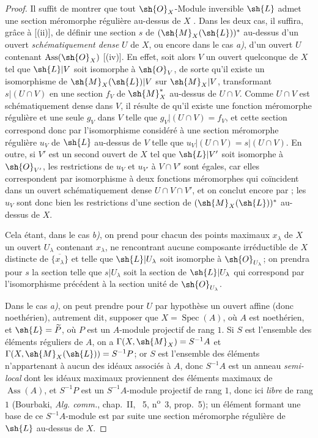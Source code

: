 \begin{proof}
Il suffit de montrer que tout $\sh{O}_X$-Module inversible $\sh{L}$ admet une section méromorphe régulière au-dessus de $X$ .
Dans les deux cas, il suffira, grâce à [(ii)], de définir une section $s$ de $(\sh{M}_X(\sh{L}))^*$ au-dessus d'un ouvert \emph{schématiquement dense} $U$ de $X$, ou encore dans le cas \emph{a)}, d'un ouvert $U$ contenant $\operatorname{Ass}(\sh{O}_X)$ [(iv)].
En effet, soit alors $V$ un ouvert quelconque de $X$ tel que $\sh{L}|V$ soit isomorphe à $\sh{O}_V$, de sorte qu'il existe un isomorphisme de $\sh{M}_X(\sh{L})|V$ sur $\sh{M}_X|V$, transformant $s|(U\cap V)$ en une section $f_V$ de $\sh{M}_X^*$ au-dessus de $U\cap V$.
Comme $U\cap V$ est schématiquement dense dans $V$, il résulte de  qu'il existe une fonction méromorphe régulière et une seule $g_V$ dans $V$ telle que $g_V|(U\cap V)=f_V$, et cette section correspond donc par l'isomorphisme considéré à une section méromorphe régulière $u_V$ de $\sh{L}$ au-dessus de $V$ telle que $u_V|(U\cap V)=s|(U\cap V)$.
En outre, si $V'$ est un second ouvert de $X$ tel que $\sh{L}|V'$ soit isomorphe à $\sh{O}_{V'}$, les restrictions de $u_V$ et $u_{V'}$ à $V\cap V'$ sont égales, car elles correspondent par isomorphisme à deux fonctions méromorphes qui coïncident dans un ouvert schématiquement dense $U\cap V\cap V'$, et on conclut encore par ;
les $u_V$ sont donc bien les restrictions d'une section de $(\sh{M}_X(\sh{L}))^*$ au-dessus de $X$.

Cela étant, dans le cas \emph{b)}, on prend pour chacun des points maximaux $x_\lambda$ de $X$ un ouvert $U_\lambda$ contenant $x_\lambda$, ne rencontrant aucune composante irréductible de $X$ distincte de $\overline{\{x_\lambda\}}$ et telle que $\sh{L}|U_\lambda$ soit isomorphe à $\sh{O}_{U_\lambda}$;
on prendra pour $s$ la section telle que $s|U_\lambda$ soit la section de $\sh{L}|U_\lambda$ qui correspond par l'isomorphisme précédent à la section unité de $\sh{O}_{U_\lambda}$.

Dans le cas \emph{a)}, on peut prendre pour $U$ par hypothèse un ouvert affine (donc noethérien), autrement dit, supposer que $X=\operatorname{Spec}(A)$, où $A$ est noethérien, et $\sh{L}=\widetilde{P}$, où $P$ est un $A$-module projectif de rang $1$.
Si $S$ est l'ensemble des éléments réguliers de $A$, on a $\Gamma(X,\sh{M}_X)=S^{-1}A$  et $\Gamma(X,\sh{M}_X(\sh{L}))=S^{-1}P$;
or $S$ est l'ensemble des éléments n'appartenant à aucun des idéaux associés à $A$, donc $S^{-1}A$ est un anneau \emph{semi-local} dont les idéaux maximaux proviennent des éléments maximaux de $\operatorname{Ass}(A)$, et $S^{-1}P$ est un $S^{-1}A$-module projectif de rang $1$, donc ici \emph{libre} de rang $1$ (Bourbaki, \emph{Alg. comm.}, chap.~II, \textsection~5, n\textsuperscript{o}~3, prop.~5);
un élément formant une base de ce $S^{-1}A$-module est par suite  une section méromorphe régulière de $\sh{L}$ au-dessus de $X$.
\end{proof}

